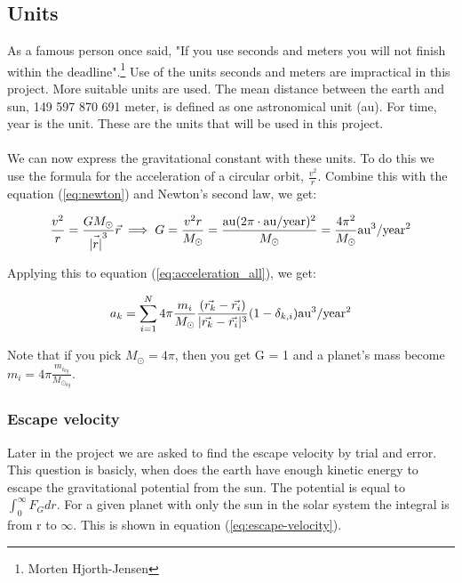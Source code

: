 \subsection{Units}\label{sec:units}
As a famous person once said, "If you use seconds and meters you will not finish within the deadline".\footnote{Morten Hjorth-Jensen} Use of the units seconds and meters are impractical in this project. More suitable units are used. The mean distance between the earth and sun, 149 597 870 691 meter, is defined as one astronomical unit (au). For time, year is the unit.
These are the units that will be used in this project. 
\\
\\
We can now express the gravitational constant with these units. To do this we use the formula for the acceleration of a circular orbit, $\frac{v^2}{r}$. Combine this with the equation (\ref{eq:newton}) and Newton's second law, we get: 

\begin{align*}
	\frac{v^2}{r} =
	\frac{GM_{\odot}}{\vec{|r|}^3}\vec{r} 
	\implies 
	G
	=
	\frac{v^2 r}{M_{\odot}} = \frac{\rm{au} (2\pi \cdot \rm{au/year})^2}{M_{\odot}}
	=
	\frac{4\pi^2}
	{M_{\odot}} \rm{au^3/year^2}
\end{align*}

\pagebreak

Applying this to equation (\ref{eq:acceleration_all}), we get: 

\begin{align}
	a_k
	=
	\sum_{i = 1}^{N}
	4 \pi \frac{m_i}{M_{\odot}}
	\frac{(\vec{r_k} - \vec{r_i})}
	{|\vec{r_k} - \vec{r_i}|^3}
	(1 - \delta_{k,i}) \rm{au^3/year^2}
	\label{eq:acceleration_all_au}
\end{align}

Note that if you pick $M_\odot = 4 \pi$, then you get G = 1 and a planet's mass become $m_i = 4\pi \frac{m_{i_{kg}}} {M_{\odot_{kg}}}$.







\subsubsection{Escape velocity}\label{sec:escape-velocity}

Later in the project we are asked to find the escape velocity by trial and error. This question is basicly, when does the earth have enough kinetic energy to escape the gravitational potential from the sun. The potential is equal to $\int_0^\infty F_G dr$. For a given planet with only the sun in the solar system the integral is from r to $\infty$. This is shown in equation (\ref{eq:escape-velocity}).  



